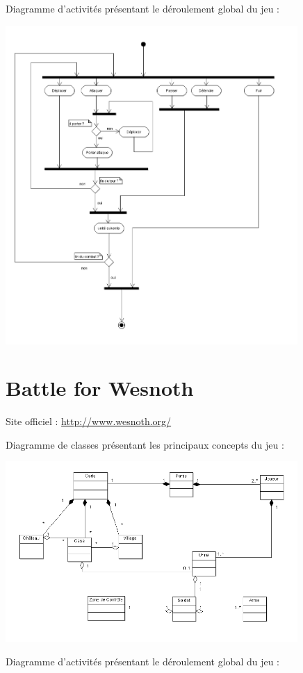 \documentclass[a4paper,10pt]{report}
\begin{document}
    Diagramme d'activités présentant le déroulement global du jeu : 
    
    \includegraphics[width=420px]{diagrammes/sequence-homm.png}
    

	\section{Battle for Wesnoth}
	
    Site officiel : \url{http://www.wesnoth.org/}
    
    Diagramme de classes présentant les principaux concepts du jeu : 
    
		\includegraphics[width=420px]{diagrammes/Concept-Battle-of-Wesnoth.png}

    Diagramme d'activités présentant le déroulement global du jeu : 
    
\end{document}
